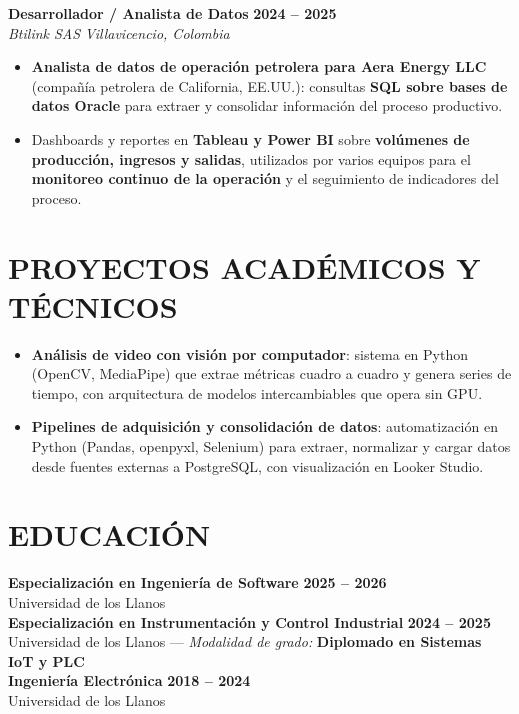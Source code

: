 \documentclass[letterpaper,10pt]{article}
\begin{document}
\textbf{Desarrollador / Analista de Datos} \hfill \textbf{2024 -- 2025} \\
\textit{Btilink SAS} \hfill \textit{Villavicencio, Colombia}
\begin{itemize}
    \item \textbf{Analista de datos de operación petrolera para Aera Energy LLC} (compañía petrolera de California, EE.UU.): consultas \textbf{SQL sobre bases de datos Oracle} para extraer y consolidar información del proceso productivo.
    \item Dashboards y reportes en \textbf{Tableau y Power BI} sobre \textbf{volúmenes de producción, ingresos y salidas}, utilizados por varios equipos para el \textbf{monitoreo continuo de la operación} y el seguimiento de indicadores del proceso.
\end{itemize}

\section{PROYECTOS ACADÉMICOS Y TÉCNICOS}
\begin{itemize}
    \item \textbf{Análisis de video con visión por computador}: sistema en Python (OpenCV, MediaPipe) que extrae métricas cuadro a cuadro y genera series de tiempo, con arquitectura de modelos intercambiables que opera sin GPU.
    \item \textbf{Pipelines de adquisición y consolidación de datos}: automatización en Python (Pandas, openpyxl, Selenium) para extraer, normalizar y cargar datos desde fuentes externas a PostgreSQL, con visualización en Looker Studio.
\end{itemize}

\section{EDUCACIÓN}
\textbf{Especialización en Ingeniería de Software} \hfill \textbf{2025 -- 2026} \\
Universidad de los Llanos \\
\textbf{Especialización en Instrumentación y Control Industrial} \hfill \textbf{2024 -- 2025} \\
Universidad de los Llanos --- \textit{Modalidad de grado:} \textbf{Diplomado en Sistemas IoT y PLC} \\
\textbf{Ingeniería Electrónica} \hfill \textbf{2018 -- 2024} \\
Universidad de los Llanos

\end{document}
